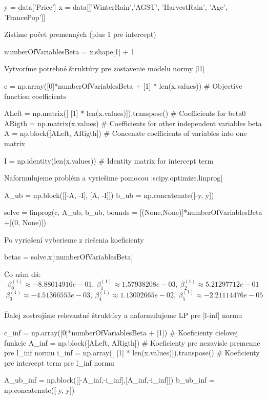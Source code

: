 \documentclass[12pt,oneside,a4paper,slovak]{article}
\begin{document}
\begin{python}
y = data['Price']
x = data[['WinterRain','AGST', 'HarvestRain', 'Age', 'FrancePop']]
\end{python}
Zistíme počet premenných (plus 1 pre intercept)
\begin{python}
numberOfVariablesBeta = x.shape[1] + 1
\end{python}
Vytvoríme potrebné štruktúry pre zostavenie modelu normy \pyth|l1|
\begin{python}
c = np.array([0]*numberOfVariablesBeta + [1] * len(x.values)) # Objective function coefficients

ALeft = np.matrix([ [1] * len(x.values)]).transpose() # Coefficients for beta0
ARigth = np.matrix(x.values) # Coefficients for other independent variables beta
A = np.block([ALeft, ARigth]) # Concenate coefficients of variables into one matrix

I = np.identity(len(x.values)) # Identity matrix for intercept term
\end{python}
Naformulujeme problém a vyriešime pomocou \pyth|scipy.optimize.linprog|
\begin{python}
A_ub = np.block([[-A, -I], [A, -I]])
b_ub = np.concatenate([-y, y])

solve = linprog(c, A_ub, b_ub, bounds = [(None,None)]*numberOfVariablesBeta +[(0, None)])
\end{python}
Po vyriešení vyberieme z riešenia koeficienty
\begin{python}
betas = solve.x[:numberOfVariablesBeta]
\end{python}
Čo nám dá: 
\begin{equation*}
	\beta_0^{(1)} \approx -8.88014916e-01 ,~\beta_1^{(1)} \approx 1.57938208e-03 ,~\beta_2^{(1)} \approx 5.21297712e-01 
\end{equation*}
\begin{equation*}
~\beta_3^{(1)} \approx -4.51366553e-03 ,~\beta_4^{(1)} \approx 1.13002665e-02  ,~\beta_5^{(1)} \approx -2.21114476e-05
\end{equation*}
\\
Ďalej zostrojíme relevantné štruktúry a naformulujeme LP pre \pyth|l-inf| normu
\begin{python}
c_inf = np.array([0]*numberOfVariablesBeta + [1]) # Koeficienty cielovej funkcie
A_inf = np.block([ALeft, ARigth]) # Koeficienty pre nezavisle premenne pre l_inf normu
i_inf = np.array([ [1] * len(x.values)]).transpose() # Koeficienty pre intercept term pre l_inf normu

A_ub_inf = np.block([[-A_inf,-i_inf],[A_inf,-i_inf]])
b_ub_inf = np.concatenate([-y, y]) 
\end{python}
\end{document}
